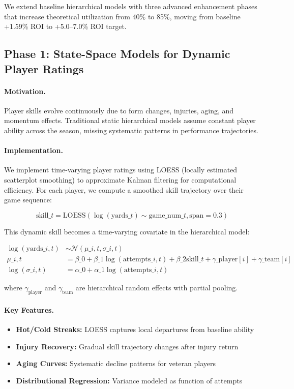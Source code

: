 We extend baseline hierarchical models with three advanced enhancement phases that increase theoretical utilization from 40\% to 85\%, moving from baseline +1.59\% ROI to +5.0--7.0\% ROI target.

\subsection{Phase 1: State-Space Models for Dynamic Player Ratings}

\paragraph{Motivation.}
Player skills evolve continuously due to form changes, injuries, aging, and momentum effects. Traditional static hierarchical models assume constant player ability across the season, missing systematic patterns in performance trajectories.

\paragraph{Implementation.}
We implement time-varying player ratings using LOESS (locally estimated scatterplot smoothing) to approximate Kalman filtering for computational efficiency. For each player, we compute a smoothed skill trajectory over their game sequence:

\begin{equation}
\text{skill}\_t = \text{LOESS}(\log(\text{yards}\_t) \sim \text{game\_num}\_t, \text{span} = 0.3)
\end{equation}

This dynamic skill becomes a time-varying covariate in the hierarchical model:

\begin{align}
\log(\text{yards}\_{i,t}) &\sim \mathcal{N}(\mu\_{i,t}, \sigma\_{i,t}) \\
\mu\_{i,t} &= \beta\_0 + \beta\_1 \log(\text{attempts}\_{i,t}) + \beta\_2 \text{skill}\_t + \gamma\_{\text{player}[i]} + \gamma\_{\text{team}[i]} \\
\log(\sigma\_{i,t}) &= \alpha\_0 + \alpha\_1 \log(\text{attempts}\_{i,t})
\end{align}

where $\gamma_{\text{player}}$ and $\gamma_{\text{team}}$ are hierarchical random effects with partial pooling.

\paragraph{Key Features.}
\begin{itemize}
  \item \textbf{Hot/Cold Streaks:} LOESS captures local departures from baseline ability
  \item \textbf{Injury Recovery:} Gradual skill trajectory changes after injury return
  \item \textbf{Aging Curves:} Systematic decline patterns for veteran players
  \item \textbf{Distributional Regression:} Variance modeled as function of attempts
\end{itemize}


